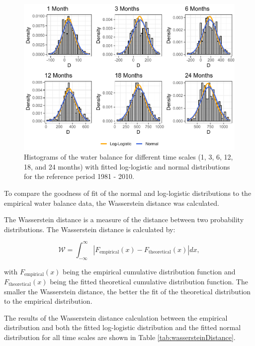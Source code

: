 \documentclass[
]{krantz}
\begin{document}
\begin{figure}
\centering
\includegraphics{book_files/figure-latex/modelfittingSPEI-1.pdf}
\caption{\label{fig:modelfittingSPEI}Histograms of the water balance for different time scales (1, 3, 6, 12, 18, and 24 months) with fitted log-logistic and normal distributions for the reference period 1981 - 2010.}
\end{figure}

To compare the goodness of fit of the normal and log-logistic distributions to the empirical water balance data, the Wasserstein distance was calculated.

The Wasserstein distance is a measure of the distance between two probability distributions. The Wasserstein distance is calculated by:

\begin{equation}
\mathcal{W} = \int_{-\infty}^{\infty} |F_{\text{empirical}}(x) - F_{\text{theoretical}}(x)| dx,
\end{equation}

with \(F_{\text{empirical}}(x)\) being the empirical cumulative distribution function and \(F_{\text{theoretical}}(x)\) being the fitted theoretical cumulative distribution function. The smaller the Wasserstein distance, the better the fit of the theoretical distribution to the empirical distribution.

The results of the Wasserstein distance calculation between the empirical distribution and both the fitted log-logistic distribution and the fitted normal distribution for all time scales are shown in Table \ref{tab:wassersteinDistance}.
\end{document}
